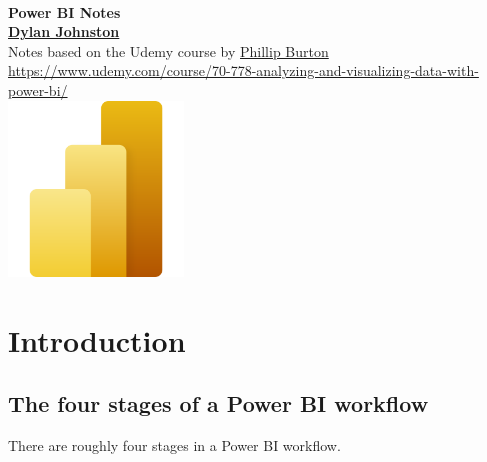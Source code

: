 \documentclass[10pt, openany, twocolumn]{book}
\begin{document}
\begin{titlepage}
    \begin{center}
        \phantom{}\\
        \vspace{30ex}        
        {\Huge \textbf{Power BI Notes}}\\
        \vspace{10ex}
        {\LARGE \textbf{\href{https://github.com/DylanJohnston}{Dylan Johnston}}}\\      
        \vspace{10ex}        
        {\large {Notes based on the Udemy course by \href{https://www.udemy.com/user/aquaviola/?srsltid=AfmBOoroy6yLJOMumklqWxK0Ip6_zhQfzzSx7M_65-DwZuR4OyaOWoc5}{Phillip Burton}} \\
        \vspace{2.5ex}
        \href{https://www.udemy.com/course/70-778-analyzing-and-visualizing-data-with-power-bi/}
        {https://www.udemy.com/course/70-778-analyzing-and-visualizing-data-with-power-bi/}}\\        
        \vspace{15ex}        
        \includegraphics[width=0.35\textwidth]{images/PowerBILogo.png}        
    \end{center}
\end{titlepage}

\tableofcontents

\onecolumn
\chapter{Introduction}

\section{The four stages of a Power BI workflow}

There are roughly four stages in a Power BI workflow.\\
\end{document}

